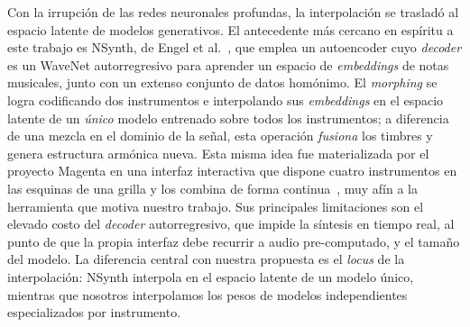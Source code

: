\documentclass[12pt,a4paper,twoside]{tesis}
\begin{document}
Con la irrupción de las redes neuronales profundas, la interpolación se trasladó al espacio latente de modelos generativos. El antecedente más cercano en espíritu a este trabajo es NSynth, de Engel et al.~\cite{engel2017nsynth}, que emplea un autoencoder cuyo \textit{decoder} es un WaveNet autorregresivo para aprender un espacio de \textit{embeddings} de notas musicales, junto con un extenso conjunto de datos homónimo. El \emph{morphing} se logra codificando dos instrumentos e interpolando sus \textit{embeddings} en el espacio latente de un \emph{único} modelo entrenado sobre todos los instrumentos; a diferencia de una mezcla en el dominio de la señal, esta operación \emph{fusiona} los timbres y genera estructura armónica nueva. Esta misma idea fue materializada por el proyecto Magenta en una interfaz interactiva que dispone cuatro instrumentos en las esquinas de una grilla y los combina de forma continua~\cite{magenta2017nsynthsoundmaker}, muy afín a la herramienta que motiva nuestro trabajo. Sus principales limitaciones son el elevado costo del \textit{decoder} autorregresivo, que impide la síntesis en tiempo real, al punto de que la propia interfaz debe recurrir a audio pre-computado, y el tamaño del modelo. La diferencia central con nuestra propuesta es el \emph{locus} de la interpolación: NSynth interpola en el espacio latente de un modelo único, mientras que nosotros interpolamos los pesos de modelos independientes especializados por instrumento.
\end{document}
